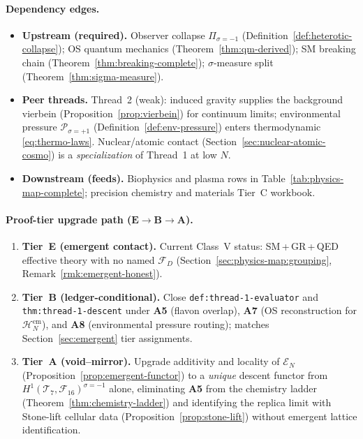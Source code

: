 \paragraph{Dependency edges.}
\begin{itemize}[leftmargin=*]
  \item \textbf{Upstream (required).}
    Observer collapse $\Pi_{\sigma=-1}$
    (Definition~\ref{def:heterotic-collapse});
    OS quantum mechanics (Theorem~\ref{thm:qm-derived});
    SM breaking chain (Theorem~\ref{thm:breaking-complete});
    $\sigma$-measure split (Theorem~\ref{thm:sigma-measure}).
  \item \textbf{Peer threads.}
    Thread~2 (weak): induced gravity supplies the background vierbein
    (Proposition~\ref{prop:vierbein}) for continuum limits;
    environmental pressure $\mathcal{P}_{\sigma=+1}$
    (Definition~\ref{def:env-pressure}) enters thermodynamic
    \eqref{eq:thermo-laws}.
    Nuclear/atomic contact (Section~\ref{sec:nuclear-atomic-cosmo}) is a
    \emph{specialization} of Thread~1 at low $N$.
  \item \textbf{Downstream (feeds).}
    Biophysics and plasma rows in Table~\ref{tab:physics-map-complete};
    precision chemistry and materials Tier~C workbook.
\end{itemize}

\paragraph{Proof-tier upgrade path ($\mathbf{E}\to\mathbf{B}\to\mathbf{A}$).}
\begin{enumerate}[label=\textbf{\arabic*.},leftmargin=*]
  \item \textbf{Tier~E (emergent contact).}
    Current Class~V status: SM\,+\,GR\,+\,QED effective theory with no
    named $\mathcal{F}_D$ (Section~\ref{sec:physics-map:grouping},
    Remark~\ref{rmk:emergent-honest}).
  \item \textbf{Tier~B (ledger-conditional).}
    Close \texttt{def:thread-1-evaluator} and
    \texttt{thm:thread-1-descent} under \textbf{A5} (flavon overlap),
    \textbf{A7} (OS reconstruction for $\mathcal{H}_N^{\mathrm{em}}$),
    and \textbf{A8} (environmental pressure routing); matches
    Section~\ref{sec:emergent} tier assignments.
  \item \textbf{Tier~A (void--mirror).}
    Upgrade additivity and locality of $\mathcal{E}_N$
    (Proposition~\ref{prop:emergent-functor}) to a \emph{unique} descent
    functor from $H^1(\mathcal{T}_7,\mathcal{F}_{16})^{\sigma=-1}$ alone,
    eliminating \textbf{A5} from the chemistry ladder
    (Theorem~\ref{thm:chemistry-ladder}) and identifying the replica limit
    with Stone-lift cellular data (Proposition~\ref{prop:stone-lift}) without
    emergent lattice identification.
\end{enumerate}

